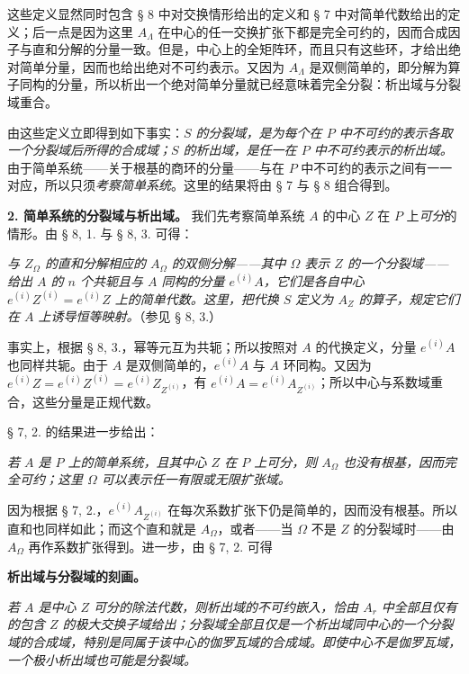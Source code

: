 \documentclass[11pt]{article}
\providecommand{\srcspaced}[1]{#1}
\begin{document}
这些定义显然同时包含 § 8 中对交换情形给出的定义和 § 7 中对简单代数给出的定义；后一点是因为这里 \(A_\Lambda\) 在中心的任一交换扩张下都是完全可约的，因而合成因子与直和分解的分量一致。但是，中心上的全矩阵环，而且只有这些环，才给出绝对简单分量，因而也给出绝对不可约表示。又因为 \(A_\Lambda\) 是双侧简单的，即分解为算子同构的分量，所以析出一个绝对简单分量就已经意味着完全分裂：析出域与分裂域重合。

由这些定义立即得到如下事实：\emph{\(S\) 的分裂域，是为每个在 \(P\) 中不可约的表示各取一个分裂域后所得的合成域；\(S\) 的析出域，是任一在 \(P\) 中不可约表示的析出域。} 由于简单系统——关于根基的商环的分量——与在 \(P\) 中不可约的表示之间有一一对应，所以只须\emph{考察简单系统}。这里的结果将由 § 7 与 § 8 组合得到。


\noindent\textbf{\srcspaced{2. 简单系统的分裂域与析出域。}} 我们先考察简单系统 \(A\) 的中心 \(Z\) 在 \(P\) 上\emph{可分}的情形。由 § 8, 1. 与 § 8, 3. 可得：

\emph{与 \(Z_\Omega\) 的直和分解相应的 \(A_\Omega\) 的双侧分解——其中 \(\Omega\) 表示 \(Z\) 的一个分裂域——给出 \(A\) 的 \(n\) 个共轭且与 \(A\) 同构的分量 \(e^{(i)}A\)，它们是各自中心 \(e^{(i)}Z^{(i)}=e^{(i)}Z\) 上的简单代数。这里，把代换 \(S\) 定义为 \(A_Z\) 的算子，规定它们在 \(A\) 上诱导恒等映射。}（参见 § 8, 3.）

事实上，根据 § 8, 3.，幂等元互为共轭；所以按照对 \(A\) 的代换定义，分量 \(e^{(i)}A\) 也同样共轭。由于 \(A\) 是双侧简单的，\(e^{(i)}A\) 与 \(A\) 环同构。又因为 \(e^{(i)}Z=e^{(i)}Z^{(i)}=e^{(i)}Z_{Z^{(i)}}\)，有 \(e^{(i)}A=e^{(i)}A_{Z^{(i)}}\)；所以中心与系数域重合，这些分量是正规代数。

§ 7, 2. 的结果进一步给出：

\emph{若 \(A\) 是 \(P\) 上的简单系统，且其中心 \(Z\) 在 \(P\) 上可分，则 \(A_\Omega\) 也没有根基，因而完全可约；这里 \(\Omega\) 可以表示任一有限或无限扩张域。}

因为根据 § 7, 2.，\(e^{(i)}A_{Z^{(i)}}\) 在每次系数扩张下仍是简单的，因而没有根基。所以直和也同样如此；而这个直和就是 \(A_\Omega\)，或者——当 \(\Omega\) 不是 \(Z\) 的分裂域时——由 \(A_\Omega\) 再作系数扩张得到。进一步，由 § 7, 2. 可得

\begin{center}
\textbf{\srcspaced{析出域与分裂域的刻画。}}
\end{center}

\emph{若 \(A\) 是中心 \(Z\) 可分的除法代数，则析出域的不可约嵌入，恰由 \(A_r\) 中全部且仅有的包含 \(Z\) 的极大交换子域给出；分裂域全部且仅是一个析出域同中心的一个分裂域的合成域，特别是同属于该中心的伽罗瓦域的合成域。即使中心不是伽罗瓦域，一个极小析出域也可能是分裂域。}
\end{document}
